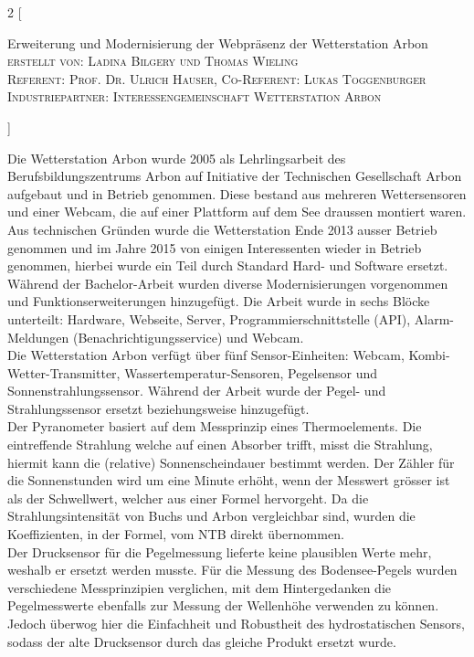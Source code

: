 \documentclass[10pt]{article}
\begin{document}
\begin{multicols}{2}
[
    \begin{center}
      {\huge\sffamily \Large Erweiterung und Modernisierung der Webpräsenz der Wetterstation Arbon}\\
       \vspace{2ex}
       \textsc{erstellt von: Ladina Bilgery und Thomas Wieling}\\
       \textsc{Referent: Prof. Dr. Ulrich Hauser, Co-Referent: Lukas Toggenburger}\\
       \textsc{Industriepartner: Interessengemeinschaft Wetterstation Arbon}      
    \end{center}
]

Die Wetterstation Arbon wurde 2005 als Lehrlingsarbeit des Berufsbildungszentrums Arbon auf Initiative der Technischen Gesellschaft Arbon aufgebaut und in Betrieb genommen. Diese bestand aus mehreren Wettersensoren und einer Webcam, die auf einer Plattform auf dem See draussen montiert waren. Aus technischen Gründen wurde die Wetterstation Ende 2013 ausser Betrieb genommen und im Jahre 2015 von einigen Interessenten wieder in Betrieb genommen, hierbei wurde ein Teil durch Standard Hard- und Software ersetzt. Während der Bachelor-Arbeit wurden diverse Modernisierungen vorgenommen und Funktionserweiterungen hinzugefügt. Die Arbeit wurde in sechs Blöcke unterteilt: Hardware, Webseite, Server, Programmierschnittstelle (API), Alarm-Meldungen (Benachrichtigungsservice) und Webcam.\\
Die Wetterstation Arbon verfügt über fünf Sensor-Einheiten: Webcam, Kombi-Wetter-Transmitter, Wassertemperatur-Sensoren, Pegelsensor und Sonnenstrahlungssensor. Während der Arbeit wurde der Pegel- und Strahlungssensor ersetzt beziehungsweise hinzugefügt.\\ 
Der Pyranometer basiert auf dem Messprinzip eines Thermoelements. Die eintreffende Strahlung welche auf einen Absorber trifft, misst die Strahlung, hiermit kann die (relative) Sonnenscheindauer bestimmt werden. Der Zähler für die Sonnenstunden wird um eine Minute erhöht, wenn der Messwert grösser ist als der Schwellwert, welcher aus einer Formel hervorgeht. Da die Strahlungsintensität von Buchs und Arbon vergleichbar sind, wurden die Koeffizienten, in der Formel, vom NTB direkt übernommen.\\
Der Drucksensor für die Pegelmessung lieferte keine plausiblen Werte mehr, weshalb er ersetzt werden musste. Für die Messung des Bodensee-Pegels wurden verschiedene Messprinzipien verglichen, mit dem Hintergedanken die Pegelmesswerte ebenfalls zur Messung der Wellenhöhe verwenden zu können. Jedoch überwog hier die Einfachheit und Robustheit des hydrostatischen Sensors, sodass der alte Drucksensor durch das gleiche Produkt ersetzt wurde. 


\end{multicols}
\end{document}
